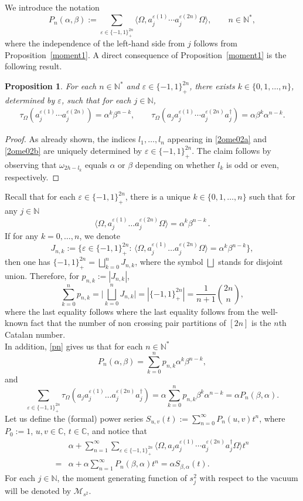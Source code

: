 \documentclass[12pt]{amsart}
\numberwithin{equation}{section}
\def\cam{{\mathcal M}}
\def\bc{{\mathbb C}}
\def\bn{{\mathbb N}}
\def\a{\alpha}
\def\b{\beta}
\def\eps{\varepsilon}
\def\t{\tau}
\def\om{\omega} \def\Om{\Omega}
\newtheorem{prop}[thm]{Proposition}
\theoremstyle{definition}
\begin{document}
We introduce the notation
\begin{equation}\label{pn}
P_n(\a,\b):=\sum_{\eps\in \{-1,1\}^{2n}_+}
\langle\Om,a_j^{\eps(1)}\cdots a_j^{\eps(2n)}\Om\rangle,
\qquad n\in\bn^*,
\end{equation}
where the independence of the left-hand side from $j$ follows from Proposition~\ref{moment1}.
A direct consequence of Proposition~\ref{moment1} is the following result.
\begin{prop}\label{moment2}
For each $n\in\bn^*$ and $\eps\in\{-1,1\}^{2n}_+$, there exists $k\in\{0,1,\ldots,n\}$, determined by $\eps$, such that for each $j\in\bn$,
\begin{align*}%
\t_\Om(a_j^{\eps(1)}\cdots a_j^{\eps(2n)})
=\a^k\b^{n-k}, \qquad
\t_\Om(a_ja_j^{\eps(1)}\cdots a_j^{\eps(2n)}a^\dag_j)
=\a\b^k\a^{n-k}.
\end{align*}
\end{prop}
\begin{proof}
As already shown, the indices $l_1,\ldots,l_n$ appearing in \eqref{2ome02a} and \eqref{2ome02b} are uniquely determined by $\eps\in\{-1,1\}^{2n}_+$. The claim follows by observing that $\om_{2h-l_k}$ equals $\a$ or $\b$ depending on whether $l_k$ is odd or even, respectively.
\end{proof}
Recall that for each $\eps\in \{-1,1\}^{2n}_+$, there is a unique $k\in\{0,1,\ldots,n\}$ such that for any $j\in\bn$
\[
\langle\Om,a_j^{\eps(1)} \ldots a_j^{\eps(2n)}\Om \rangle=\a^k\b^{n-k}\,.
\]
If for any $k=0,\ldots,n$, we denote
\[
J_{n,k}:=\big\{\eps\in \{-1,1\}^{2n}_+:\,\langle\Om, a_j^{\eps(1)}\ldots a_j^{\eps(2n)}\Om \rangle =\a^k\b^{n-k}\big\},
\]
then one has $\{-1,1\}^{2n}_+=\bigsqcup_{k=0}^n J_{n,k}$, where the symbol $\bigsqcup$ stands for disjoint union.  Therefore, for $p_{n,k}:= |J_{n,k}|$,
\begin{equation}\label{cata}
\sum_{k=0}^n p_{n,k} = \bigg|\bigsqcup_{k=0}^n J_{n,k}\bigg| = |\{-1,1\}^{2n}_+| = \frac{1}{n+1}\binom{2n}{n},
\end{equation}
where the last equality follows where the last equality follows from the well-known fact that the number of non crossing pair partitions of $[2n]$ is the $n$th Catalan number.\\
In addition, \eqref{pn} gives us that for each $n\in\bn^*$
\[
P_n(\a,\b)=\sum_{k=0}^n p_{n,k}\a^k\b^{n-k},
\]
and
\begin{equation}\label{acata}
\sum_{\eps\in \{-1,1\}^{2n}_+} \t_\Om(a_j a_j^{\eps(1)} \ldots a_j^{\eps(2n)} a_j^\dag)= \a \sum_{k=0}^n p_{n,k} \b^k \a^{n-k} = \a P_n(\b,\a).
\end{equation}
Let us define the (formal) power series $S_{u,v}(t):=\sum_{n=0}^{\infty} P_n(u,v) t^n$, where $P_0 := 1$, $u,v\in\bc$, $t\in\bc$, and notice that
\begin{align*}
&\a + \sum_{n=1}^\infty \sum_{\eps\in \{-1,1\}^{2n}_+} \langle \Om, a_j a_j^{\eps(1)} \cdots a_j^{\eps(2n)} a_j^\dag \Om \rangle t^n \\
=& \a + \a \sum_{n=1}^\infty P_n(\b,\a) t^n = \a S_{\b,\a}(t).
\end{align*}
For each $j\in\bn$, the moment generating function of $s_j^2$ with respect to the vacuum will be denoted by $\cam_{s^2}$.
\end{document}

